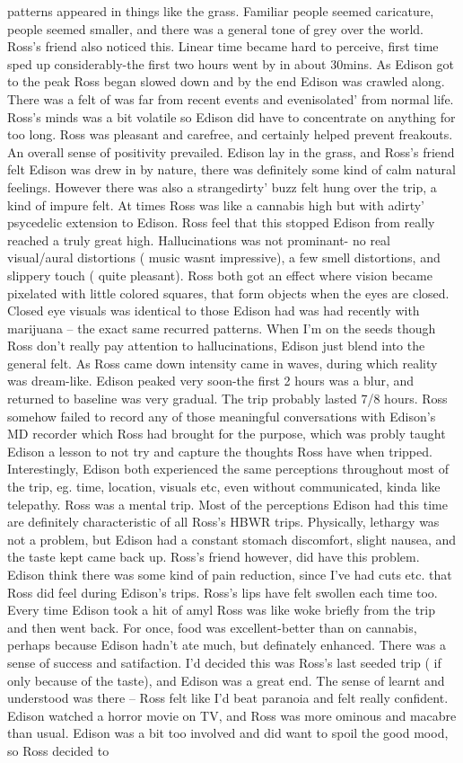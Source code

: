\documentclass[12pt]{book}
\begin{document}
patterns appeared in things like the grass. Familiar people seemed caricature, people seemed smaller, and there was a general tone of grey over the world. Ross's friend also noticed this. Linear time became hard to perceive, first time sped up considerably-the first two hours went by in about 30mins. As Edison got to the peak Ross began slowed down and by the end Edison was crawled along. There was a felt of was far from recent events and evenisolated' from normal life. Ross's minds was a bit volatile so Edison did have to concentrate on anything for too long. Ross was pleasant and carefree, and certainly helped prevent freakouts. An overall sense of positivity prevailed. Edison lay in the grass, and Ross's friend felt Edison was drew in by nature, there was definitely some kind of calm natural feelings. However there was also a strangedirty' buzz felt hung over the trip, a kind of impure felt. At times Ross was like a cannabis high but with adirty' psycedelic extension to Edison. Ross feel that this stopped Edison from really reached a truly great high. Hallucinations was not prominant- no real visual/aural distortions ( music wasnt impressive), a few smell distortions, and slippery touch ( quite pleasant). Ross both got an effect where vision became pixelated with little colored squares, that form objects when the eyes are closed. Closed eye visuals was identical to those Edison had was had recently with marijuana -- the exact same recurred patterns. When I'm on the seeds though Ross don't really pay attention to hallucinations, Edison just blend into the general felt. As Ross came down intensity came in waves, during which reality was dream-like. Edison peaked very soon-the first 2 hours was a blur, and returned to baseline was very gradual. The trip probably lasted 7/8 hours. Ross somehow failed to record any of those meaningful conversations with Edison's MD recorder which Ross had brought for the purpose, which was probly taught Edison a lesson to not try and capture the thoughts Ross have when tripped. Interestingly, Edison both experienced the same perceptions throughout most of the trip, eg. time, location, visuals etc, even without communicated, kinda like telepathy. Ross was a mental trip. Most of the perceptions Edison had this time are definitely characteristic of all Ross's HBWR trips. Physically, lethargy was not a problem, but Edison had a constant stomach discomfort, slight nausea, and the taste kept came back up. Ross's friend however, did have this problem. Edison think there was some kind of pain reduction, since I've had cuts etc. that Ross did feel during Edison's trips. Ross's lips have felt swollen each time too. Every time Edison took a hit of amyl Ross was like woke briefly from the trip and then went back. For once, food was excellent-better than on cannabis, perhaps because Edison hadn't ate much, but definately enhanced. There was a sense of success and satifaction. I'd decided this was Ross's last seeded trip ( if only because of the taste), and Edison was a great end. The sense of learnt and understood was there -- Ross felt like I'd beat paranoia and felt really confident. Edison watched a horror movie on TV, and Ross was more ominous and macabre than usual. Edison was a bit too involved and did want to spoil the good mood, so Ross decided to 
\end{document}
